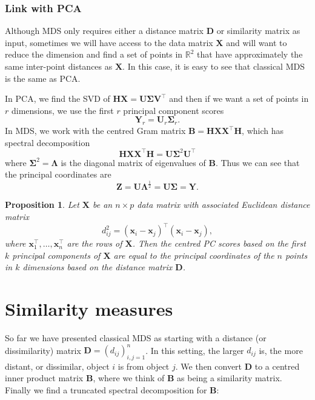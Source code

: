 \documentclass[
]{book}
\newtheorem{proposition}{Proposition}[chapter]
\theoremstyle{definition}
\theoremstyle{definition}
\theoremstyle{definition}
\theoremstyle{definition}
\theoremstyle{remark}
\begin{document}
\subsubsection*{Link with PCA}\label{link-with-pca}

Although MDS only requires either a distance matrix \(\mathbf D\) or similarity matrix as input, sometimes we will have access to the data matrix \(\mathbf X\) and will want to reduce the dimension and
find a set of points in \(\mathbb{R}^2\) that have approximately the same inter-point distances as \(\mathbf X\). In this case, it is easy to see that classical MDS is the same as PCA.

In PCA, we find the SVD of \(\mathbf H\mathbf X= \mathbf U\boldsymbol{\Sigma}\mathbf V^\top\) and then if we want a set of points in \(r\) dimensions, we use the first \(r\) principal component scores
\[\mathbf Y_r=\mathbf U_{r}\boldsymbol{\Sigma}_r.\]
In MDS, we work with the centred Gram matrix
\(\mathbf B=\mathbf H\mathbf X\mathbf X^\top \mathbf H\), which has spectral decomposition
\[\mathbf H\mathbf X\mathbf X^\top \mathbf H= \mathbf U\boldsymbol{\Sigma}^2 \mathbf U^\top\]
where \(\boldsymbol{\Sigma}^2 =\boldsymbol \Lambda\) is the diagonal matrix of eigenvalues of \(\mathbf B\). Thus we can see that the principal coordinates are
\[\mathbf Z= \mathbf U\boldsymbol \Lambda^\frac{1}{2} = \mathbf U\boldsymbol{\Sigma}=\mathbf Y.\]

\begin{proposition}
\protect\hypertarget{prp:mds0}{}\label{prp:mds0}Let \(\mathbf X\) be an \(n \times p\) data matrix with associated Euclidean distance matrix
\[
d_{ij}^2 = (\mathbf x_i -\mathbf x_j)^\top(\mathbf x_i -\mathbf x_j),
\]
where \(\mathbf x_1^\top, \ldots , \mathbf x_n^\top\) are the rows of \(\mathbf X\). Then the centred PC scores based on the first \(k\) principal components of \(\mathbf X\) are equal to the principal coordinates of the \(n\) points in \(k\) dimensions based on the distance matrix \(\mathbf D\).
\end{proposition}

\section{Similarity measures}\label{similarity}

So far we have presented classical MDS as starting with a distance (or dissimilarity) matrix \(\mathbf D=(d_{ij})_{i,j=1}^n\). In this setting, the larger \(d_{ij}\) is, the more distant, or dissimilar, object \(i\) is from object \(j\).
We then convert \(\mathbf D\) to a centred inner product matrix \(\mathbf B\), where we think of \(\mathbf B\) as being a similarity matrix. Finally we find a truncated spectral decomposition for \(\mathbf B\):
\end{document}
